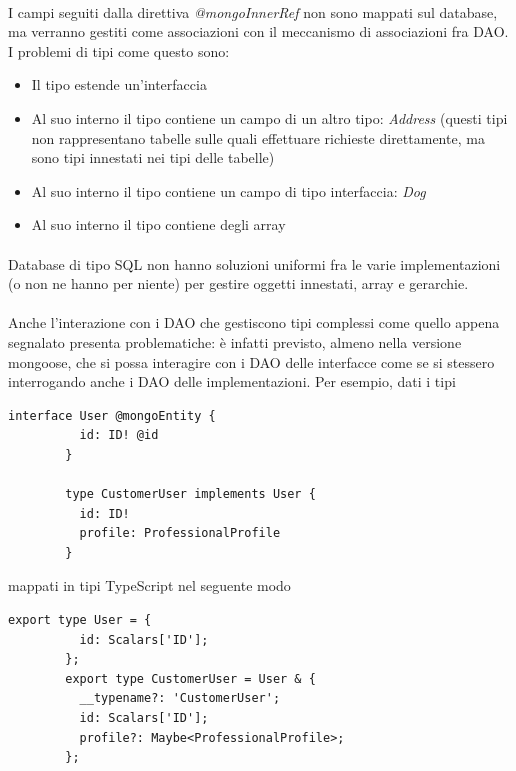 \documentclass[a4paper, 12pt]{report}
\begin{document}
      \paragraph*{}
      I campi seguiti dalla direttiva \emph{@mongoInnerRef} non sono mappati sul database, ma verranno gestiti come associazioni con il meccanismo di associazioni fra DAO.\\
      I problemi di tipi come questo sono:
      \begin{itemize}
        \item Il tipo estende un'interfaccia
        \item Al suo interno il tipo contiene un campo di un altro tipo: \emph{Address} (questi tipi non rappresentano tabelle sulle quali effettuare richieste direttamente, ma sono tipi innestati nei tipi delle tabelle)
        \item Al suo interno il tipo contiene un campo di tipo interfaccia: \emph{Dog}
        \item Al suo interno il tipo contiene degli array
      \end{itemize}
      
      \paragraph*{}
      Database di tipo SQL non hanno soluzioni uniformi fra le varie implementazioni (o non ne hanno per niente) per gestire oggetti innestati, array e gerarchie.\\

      \paragraph*{}
      Anche l'interazione con i DAO che gestiscono tipi complessi come quello appena segnalato presenta problematiche: è infatti previsto, almeno nella versione mongoose, che si possa interagire con i DAO delle interfacce come se si stessero interrogando anche i DAO delle implementazioni.
      Per esempio, dati i tipi
      \begin{Verbatim}[samepage=true]
        interface User @mongoEntity {
          id: ID! @id
        }

        type CustomerUser implements User {
          id: ID!
          profile: ProfessionalProfile
        }
      \end{Verbatim}

      mappati in tipi TypeScript nel seguente modo

      \begin{Verbatim}[samepage=true]
        export type User = {
          id: Scalars['ID'];
        };
        export type CustomerUser = User & {
          __typename?: 'CustomerUser';
          id: Scalars['ID'];
          profile?: Maybe<ProfessionalProfile>;
        };
      \end{Verbatim}
\end{document}

